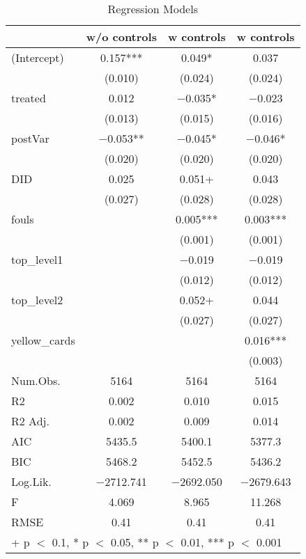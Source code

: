 \begin{table}

\caption{Regression Models}
\centering
\begin{tabular}[t]{lccc}
\toprule
  & w/o controls & w controls & w controls \\
\midrule
(Intercept) & \num{0.157}*** & \num{0.049}* & \num{0.037}\\
 & (\num{0.010}) & (\num{0.024}) & (\num{0.024})\\
treated & \num{0.012} & \num{-0.035}* & \num{-0.023}\\
 & (\num{0.013}) & (\num{0.015}) & (\num{0.016})\\
postVar & \num{-0.053}** & \num{-0.045}* & \num{-0.046}*\\
 & (\num{0.020}) & (\num{0.020}) & (\num{0.020})\\
DID & \num{0.025} & \num{0.051}+ & \num{0.043}\\
 & (\num{0.027}) & (\num{0.028}) & (\num{0.028})\\
fouls &  & \num{0.005}*** & \num{0.003}***\\
 &  & (\num{0.001}) & (\num{0.001})\\
top\_level1 &  & \num{-0.019} & \num{-0.019}\\
 &  & (\num{0.012}) & (\num{0.012})\\
top\_level2 &  & \num{0.052}+ & \num{0.044}\\
 &  & (\num{0.027}) & (\num{0.027})\\
yellow\_cards &  &  & \num{0.016}***\\
 &  &  & (\num{0.003})\\
\midrule
Num.Obs. & \num{5164} & \num{5164} & \num{5164}\\
R2 & \num{0.002} & \num{0.010} & \num{0.015}\\
R2 Adj. & \num{0.002} & \num{0.009} & \num{0.014}\\
AIC & \num{5435.5} & \num{5400.1} & \num{5377.3}\\
BIC & \num{5468.2} & \num{5452.5} & \num{5436.2}\\
Log.Lik. & \num{-2712.741} & \num{-2692.050} & \num{-2679.643}\\
F & \num{4.069} & \num{8.965} & \num{11.268}\\
RMSE & \num{0.41} & \num{0.41} & \num{0.41}\\
\bottomrule
\multicolumn{4}{l}{\rule{0pt}{1em}+ p $<$ 0.1, * p $<$ 0.05, ** p $<$ 0.01, *** p $<$ 0.001}\\
\end{tabular}
\end{table}
